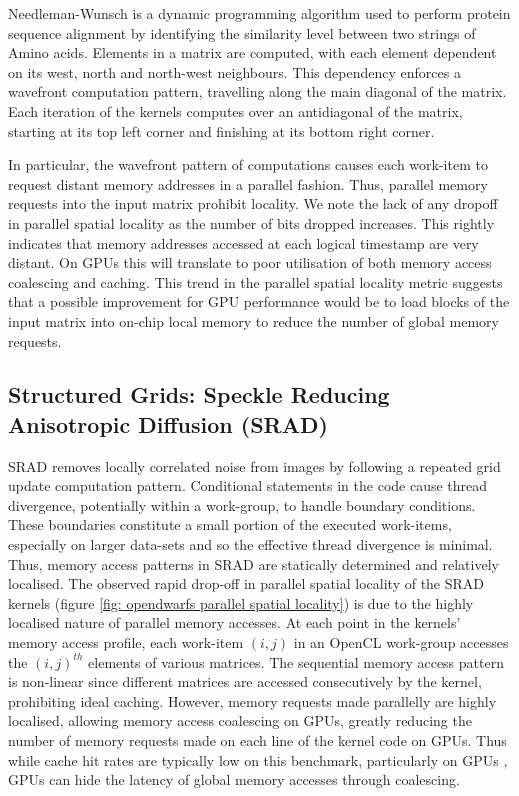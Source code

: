 \documentclass[review=false, sigchi]{acmart}
\begin{document}
	Needleman-Wunsch is a dynamic programming algorithm used to perform protein sequence alignment by identifying the similarity level between two strings of Amino acids. Elements in a matrix are computed, with each element dependent on its west, north and north-west neighbours. This dependency enforces a wavefront computation pattern, travelling along the main diagonal of the matrix. Each iteration of the kernels computes over an antidiagonal of the matrix, starting at its top left corner and finishing at its bottom right corner.
	
	In particular, the wavefront pattern of computations causes each work-item to request distant memory addresses in a parallel fashion. Thus, parallel memory requests into the input matrix prohibit locality. We note the lack of any dropoff in parallel spatial locality as the number of bits dropped increases. This rightly indicates that memory addresses accessed at each logical timestamp are very distant. On GPUs this will translate to poor utilisation of both memory access coalescing and caching. This trend in the parallel spatial locality metric suggests that a possible improvement for GPU performance would be to load blocks of the input matrix into on-chip local memory to reduce the number of global memory requests. 
	
	\subsection{Structured Grids: Speckle Reducing Anisotropic Diffusion (SRAD)}
	
	SRAD removes locally correlated noise from images by following a repeated grid update computation pattern. Conditional statements in the code cause thread divergence, potentially within a work-group, to handle boundary conditions. These boundaries constitute a small portion of the executed work-items, especially on larger data-sets and so the effective thread divergence is minimal. Thus, memory access patterns in SRAD are statically determined and relatively localised. The observed rapid drop-off in parallel spatial locality of the SRAD kernels (figure \ref{fig: opendwarfs parallel spatial locality}) is due to the highly localised nature of parallel memory accesses. At each point in the kernels' memory access profile, each work-item $(i,j)$ in an OpenCL work-group accesses the $(i,j)^{th}$ elements of various matrices. The sequential memory access pattern is non-linear since different matrices are accessed consecutively by the kernel, prohibiting ideal caching. However, memory requests made parallelly are highly localised, allowing memory access coalescing on GPUs, greatly reducing the number of memory requests made on each line of the kernel code on GPUs. Thus while cache hit rates are typically low on this benchmark, particularly on GPUs \cite{krommydas2016opendwarfs}, GPUs can hide the latency of global memory accesses through coalescing.
	
\end{document}
